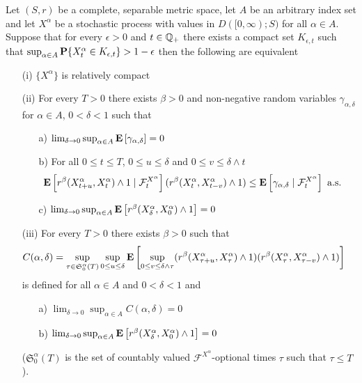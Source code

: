 \begin{thm}\label{SkorohodInfiniteKurtzAldousCriterion}Let $(S,r)$ be a complete, separable metric space, let $A$ be an arbitrary index set and let $X^\alpha$ be a stochastic process with values in $D([0,\infty); S)$ for all $\alpha \in A$.  Suppose that for every $\epsilon > 0$ and $t \in \rationals_+$ there exists a compact set $K_{\epsilon,t}$ such that $\sup_{\alpha \in A} \probability{X^\alpha_t \in K_{\epsilon,t}} > 1 - \epsilon$ then the following are equivalent
\begin{itemize}
\item[(i)] $\lbrace X^\alpha \rbrace$ is relatively compact
\item[(ii)] For every $T>0$ there exists $\beta > 0$ and non-negative random variables $\gamma_{\alpha, \delta}$ for $\alpha \in A$, $0 < \delta < 1$ such that
\begin{itemize}
\item[a)] $\lim_{\delta \to 0} \sup_{\alpha \in A} \expectation{\gamma_{\alpha, \delta}} = 0$
\item[b)] For all $0 \leq t \leq T$, $0 \leq u \leq \delta$ and $0 \leq v \leq \delta \wedge t$
\begin{align*}
\cexpectationlong{\mathcal{F}^{X^\alpha}_t}{r^\beta(X^\alpha_{t+u}, X^\alpha_t) \wedge 1} (r^\beta(X^\alpha_{t}, X^\alpha_{t -v}) \wedge 1) 
&\leq \cexpectationlong{\mathcal{F}^{X^\alpha}_t}{\gamma_{\alpha, \delta}} \text{ a.s.}
\end{align*}
\item[c)] $\lim_{\delta \to 0} \sup_{\alpha \in A} \expectation{r^\beta(X^\alpha_\delta, X^\alpha_0) \wedge 1} = 0$
\end{itemize}
\item[(iii)]For every $T>0$ there exists $\beta > 0$ such that 
\begin{align*}
C(\alpha, \delta) &= \sup_{\tau \in \mathfrak{S}^\alpha_0(T)} \sup_{0 \leq u \leq \delta} 
\expectation{\sup_{0 \leq v \leq \delta \wedge \tau} 
(r^\beta(X^\alpha_{\tau+u}, X^\alpha_\tau) \wedge 1)
(r^\beta(X^\alpha_{\tau}, X^\alpha_{\tau -v}) \wedge 1)}
\end{align*}
is defined for all $\alpha \in A$ and $0 < \delta < 1$ and 
\begin{itemize}
\item[a)] $\lim_{\delta \to 0} \sup_{\alpha \in A} C(\alpha, \delta) = 0$
\item[b)] $\lim_{\delta \to 0} \sup_{\alpha \in A} \expectation{r^\beta(X^\alpha_\delta, X^\alpha_0) \wedge 1} = 0$
\end{itemize}
($\mathfrak{S}^\alpha_0(T)$ is the set of countably valued $\mathcal{F}^{X^\alpha}$-optional times $\tau$ such that $\tau \leq T$).
\end{itemize}
\end{thm}
